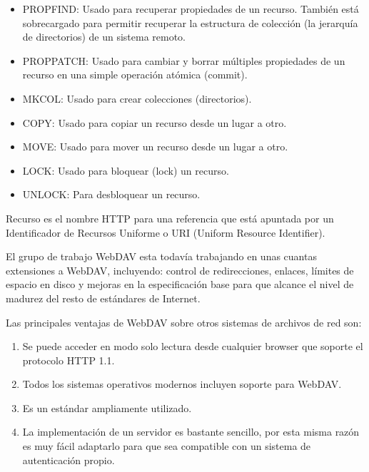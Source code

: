 \begin{itemize}

	\item PROPFIND: Usado para recuperar propiedades de un recurso. También está sobrecargado para permitir recuperar la estructura de colección (la jerarquía de directorios) de un sistema remoto.
	
	\item PROPPATCH: Usado para cambiar y borrar múltiples propiedades de un recurso en una simple operación atómica (commit).
	
	\item MKCOL: Usado para crear colecciones (directorios).
	
	\item COPY: Usado para copiar un recurso desde un lugar a otro.
	
	\item MOVE: Usado para mover un recurso desde un lugar a otro.
	
	\item LOCK: Usado para bloquear (lock) un recurso.
	
	\item UNLOCK: Para desbloquear un recurso.

\end{itemize}

Recurso es el nombre HTTP para una referencia que está apuntada por un Identificador de Recursos Uniforme o URI (Uniform Resource Identifier).

El grupo de trabajo WebDAV esta todavía trabajando en unas cuantas extensiones a WebDAV, incluyendo: control de redirecciones, enlaces, límites de espacio en disco y mejoras en la especificación base para que alcance el nivel de madurez del resto de estándares de Internet.

Las principales ventajas de WebDAV sobre otros sistemas de archivos de red son:

\begin{enumerate}

	\item Se puede acceder en modo solo lectura desde cualquier browser que soporte el protocolo HTTP 1.1.
	
	\item Todos los sistemas operativos modernos incluyen soporte para WebDAV.
	
	\item Es un estándar ampliamente utilizado.
	
	\item La implementación de un servidor es bastante sencillo, por esta misma razón es muy fácil adaptarlo para que sea compatible con un sistema de autenticación propio.

\end{enumerate}


